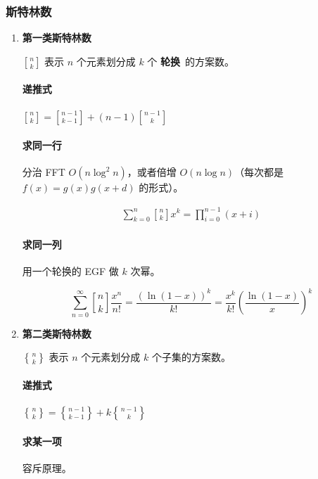 \documentclass[a4paper, twoside]{article}
\begin{document}
        \subsubsection{斯特林数}
        \begin{enumerate}

            \item \textbf{第一类斯特林数}
            
            $n\brack k$ 表示 $n$ 个元素划分成 $k$ 个 \textbf{轮换}\ 的方案数。
            
            \paragraph{递推式} ${n \brack k} = {n-1 \brack k-1} + (n-1){n-1 \brack k}$
            
            \paragraph{求同一行} 分治 FFT $O(n\log ^2 n)$，或者倍增 $O(n\log n)$（每次都是 $f(x) = g(x) g(x + d)$ 的形式）。
            
            $$ \begin{aligned} \sum_{k = 0} ^ n {n \brack k} x^k = \prod_{i = 0} ^ {n - 1} (x + i) \end{aligned} $$
            
            \paragraph{求同一列} 用一个轮换的 EGF 做 $k$ 次幂。
            
            $$ \sum_{n = 0} ^ \infty {n \brack k} \frac {x ^ n} {n!} = \frac {\left(\ln (1 - x)\right) ^ k} {k!} = \frac {x ^ k} {k!} \left( \frac {\ln (1 - x)} x \right) ^ k $$
            
            \item \textbf{第二类斯特林数}
            
            $n\brace k$ 表示 $n$ 个元素划分成 $k$ 个子集的方案数。
            
            \paragraph{递推式} ${n \brace k} = {n-1 \brace k-1} + k{n-1 \brace k}$
            
            \paragraph{求某一项} 容斥原理。
            

\end{enumerate}
\end{document}
